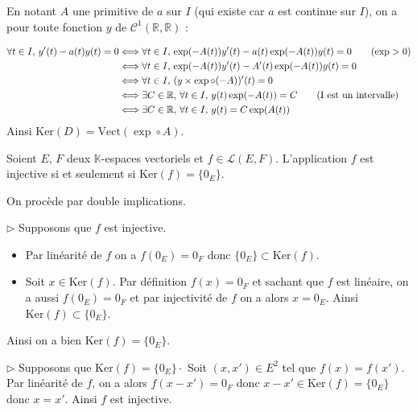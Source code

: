 \documentclass[french,11pt,twoside]{VcCours}
\renewcommand{\trou}[1]{{\color{blue}#1}}
\begin{document}
\medskip 

En notant $A$ une primitive de $a$ sur $I$ (qui existe car $a$ est continue sur $I$), on a pour toute fonction $y$ de $\mathcal{C}^1(\mathbb{R}, \mathbb{R})$ : 

\begin{align*}
\forall t \in I, \, y'(t)-a(t)y(t) =0& \Longleftrightarrow  \forall t \in I, \, \exp(-A(t))y'(t)- a(t)\exp(-A(t))y(t) = 0  \qquad (\exp >0)\\
 & \Longleftrightarrow  \forall t \in I, \, \exp(-A(t))y'(t)- A'(t)\exp(-A(t))y(t) = 0 \\
 & \Longleftrightarrow  \forall t \in I, \, (y \times \exp \circ (-A))'(t) = 0 \\
 & \Longleftrightarrow  \exists C \in \mathbb{R}, \,  \forall t \in I, \, y(t)  \exp (-A(t)) = C \qquad \hbox{(I est un intervalle)}\\
 & \Longleftrightarrow  \exists C \in \mathbb{R}, \,  \forall t \in I, \, y(t) = C \exp (A(t)) \\
\end{align*}
Ainsi $\textrm{Ker}(D) = \textrm{Vect}(\exp \circ A)$.

\begin{Proposition}{} Soient $E$, $F$ deux $\mathbb{K}$-espaces vectoriels et $f \in \mathcal{L}(E,F)$. L'application $f$ est injective si et seulement si $\textrm{Ker}(f) = \lbrace 0_E \rbrace$.
\end{Proposition}

\begin{Demonstration}{} On procède par double implications.

\trou{
$\rhd$ Supposons que $f$ est injective.

\begin{itemize}
\item Par linéarité de $f$ on a $f(0_E)=0_F$ donc $\lbrace 0_E \rbrace  \subset \textrm{Ker}(f)$.
\item Soit $x \in \textrm{Ker}(f)$. Par définition $f(x)=0_F$ et sachant que $f$ est linéaire, on a aussi $f(0_E)=0_F$ et par injectivité de $f$ on a alors $x = 0_E$. Ainsi $\textrm{Ker}(f) \subset \lbrace 0_E \rbrace$.
\end{itemize}
Ainsi on a bien $\textrm{Ker}(f) = \lbrace 0_E \rbrace$.

\medskip

$\rhd$ Supposons que $\textrm{Ker}(f) = \lbrace 0_E \rbrace \cdot$ Soit $(x,x') \in E^2$ tel que $f(x) = f(x')$. Par linéarité de $f$, on a alors $f(x-x')= 0_F$ donc $x-x' \in \textrm{Ker}(f) = \lbrace 0_E \rbrace$ donc $x=x'$. Ainsi $f$ est injective.
}
\end{Demonstration}
\end{document}
